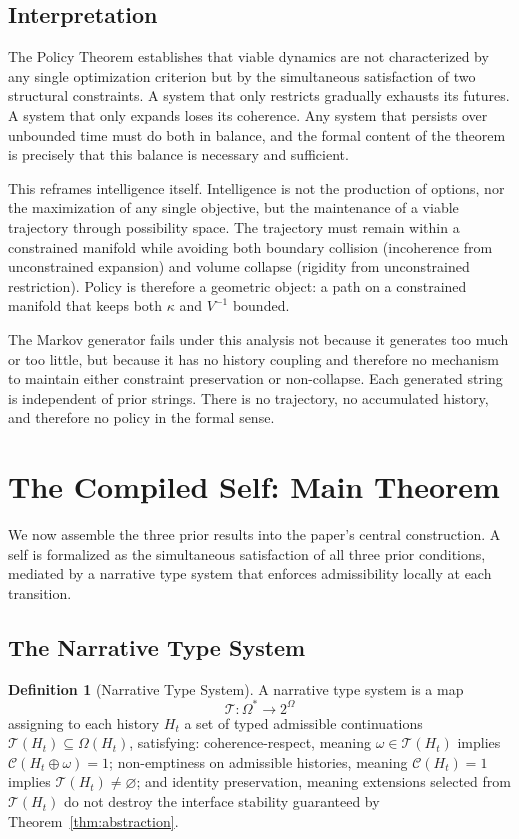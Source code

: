 \documentclass[12pt, a4paper]{article}
\theoremstyle{plain}
\theoremstyle{definition}
\newtheorem{definition}[theorem]{Definition}
\theoremstyle{remark}
\begin{document}
\subsection{Interpretation}

The Policy Theorem establishes that viable dynamics are not characterized by any single optimization criterion but by the simultaneous satisfaction of two structural constraints. A system that only restricts gradually exhausts its futures. A system that only expands loses its coherence. Any system that persists over unbounded time must do both in balance, and the formal content of the theorem is precisely that this balance is necessary and sufficient.

This reframes intelligence itself. Intelligence is not the production of options, nor the maximization of any single objective, but the maintenance of a viable trajectory through possibility space. The trajectory must remain within a constrained manifold while avoiding both boundary collision (incoherence from unconstrained expansion) and volume collapse (rigidity from unconstrained restriction). Policy is therefore a geometric object: a path on a constrained manifold that keeps both $\kappa$ and $V^{-1}$ bounded.

The Markov generator fails under this analysis not because it generates too much or too little, but because it has no history coupling and therefore no mechanism to maintain either constraint preservation or non-collapse. Each generated string is independent of prior strings. There is no trajectory, no accumulated history, and therefore no policy in the formal sense.

\section{The Compiled Self: Main Theorem}

We now assemble the three prior results into the paper's central construction. A self is formalized as the simultaneous satisfaction of all three prior conditions, mediated by a narrative type system that enforces admissibility locally at each transition.

\subsection{The Narrative Type System}

\begin{definition}[Narrative Type System]
A narrative type system is a map
\[
\mathcal{T} : \Omega^* \to 2^{\Omega}
\]
assigning to each history $H_t$ a set of typed admissible continuations $\mathcal{T}(H_t) \subseteq \Omega(H_t)$, satisfying: coherence-respect, meaning $\omega \in \mathcal{T}(H_t)$ implies $\mathcal{C}(H_t \oplus \omega) = 1$; non-emptiness on admissible histories, meaning $\mathcal{C}(H_t) = 1$ implies $\mathcal{T}(H_t) \neq \varnothing$; and identity preservation, meaning extensions selected from $\mathcal{T}(H_t)$ do not destroy the interface stability guaranteed by Theorem~\ref{thm:abstraction}.
\end{definition}
\end{document}
